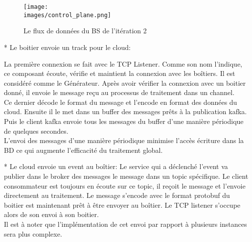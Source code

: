              \begin{figure}[ht]
                \centering
                \texttt{[image: \\images/control\_plane.png]}
                \caption{Le flux de données du BS de l'itération 2}
                \label{Figure }
            \end{figure}


            * Le boitier envoie un track pour le cloud: 


            La première connexion se fait avec le TCP Listener. 
            Comme son nom l’indique, ce composant écoute, vérifie et  maintient la 
            connexion avec les boîtiers. Il est considéré comme le Générateur. 
            Après avoir vérifier la connexion avec un boitier donné, il envoie le 
            message reçu au processus de traitement dans un channel. \\
            Ce dernier décode le format du message et l’encode en format des données du 
            cloud. Ensuite il le met dans un buffer des messages prêts à la publication 
            kafka. Puis le client kafka envoie tous les messages du buffer d’une manière 
            périodique de quelques secondes.\\ 
            L’envoi des messages d’une manière périodique minimise l'accès 
            écriture dans la BD ce qui augmente l’efficacité du traitement global. 

            *  Le cloud envoie un event au boîtier: 
            Le service qui a déclenché l’event va publier dans le broker des messages le 
            message dans un topic spécifique. Le client consommateur est toujours en écoute sur ce topic, 
            il reçoit le message et l'envoie directement au traitement. Le message s’encode avec le format 
            protobuf du boitier est maintenant prêt à être envoyer au boîtier. Le TCP listener s’occupe alors 
            de son envoi à son boitier. \\
            Il est à noter que l'implémentation de cet envoi par rapport à plusieurs 
            instances sera plus complexe. 

